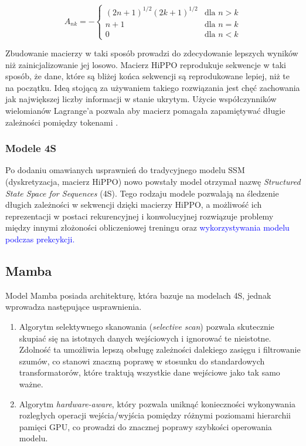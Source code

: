 \documentclass[data-science]{agh-wi} %
\begin{document}
\begin{equation}
    A_{nk} = -
    \begin{cases}
        (2n + 1)^{1/2} (2k + 1)^{1/2} & \text{dla } n > k \\
        n + 1                         & \text{dla } n = k \\
        0                             & \text{dla } n < k
    \end{cases}
    \label{equ:hippo_matrix}
\end{equation}

Zbudowanie macierzy w taki sposób prowadzi do zdecydowanie lepszych wyników niż zainicjalizowanie jej losowo. Macierz HiPPO reprodukuje sekwencje w taki sposób, że dane, które są bliżej końca sekwencji są reprodukowane lepiej, niż te na początku. Ideą stojącą za używaniem takiego rozwiązania jest chęć zachowania jak największej liczby informacji w stanie ukrytym. Użycie współczynników wielomianów Lagrange'a pozwala aby macierz pomagała zapamiętywać długie zależności pomiędzy tokenami \cite{lagrange}.

\subsubsection*{Modele 4S}
Po dodaniu omawianych usprawnień do tradycyjnego modelu SSM (dyskretyzacja, macierz HiPPO) nowo powstały model otrzymał nazwę \textit{Structured State Space for Sequences} (4S). Tego rodzaju modele pozwalają na śledzenie długich zależności w sekwencji dzięki macierzy HiPPO, a możliwość ich reprezentacji w postaci rekurencyjnej i konwolucyjnej rozwiązuje problemy między innymi złożoności obliczeniowej treningu oraz \textcolor{blue}{wykorzystywania modelu podczas prekcykcji.}

\subsection{Mamba}
Model Mamba posiada architekturę, która bazuje na modelach 4S, jednak wprowadza następujące usprawnienia.
\begin{enumerate}
    \item Algorytm selektywnego skanowania (\textit{selective scan}) pozwala skutecznie skupiać się na istotnych danych wejściowych i ignorować te nieistotne. Zdolność ta umożliwia lepszą obsługę zależności dalekiego zasięgu i filtrowanie szumów, co stanowi znaczną poprawę w stosunku do standardowych transformatorów, które traktują wszystkie dane wejściowe jako tak samo ważne.
    \item Algorytm \textit{hardware-aware}, który pozwala uniknąć konieczności wykonywania rozległych operacji wejścia/wyjścia pomiędzy różnymi poziomami hierarchii pamięci GPU, co prowadzi do znacznej poprawy szybkości operowania modelu.
\end{enumerate}
\end{document}
